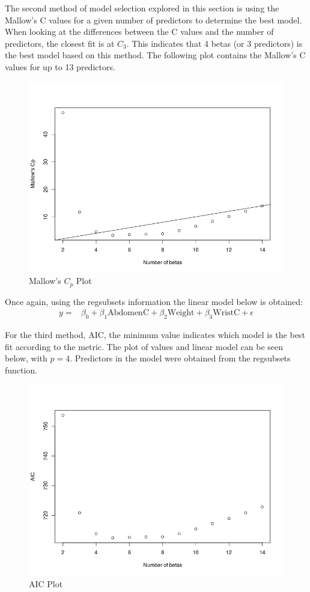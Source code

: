 \documentclass[a4paper, 11pt]{article}
\begin{document}
The second method of model selection explored in this section is using the Mallow's C values for a given number of predictors to determine the best model. When looking at the differences between the C values and the number of predictors, the closest fit is at $C_3$. This indicates that 4 betas (or 3 predictors) is the best model based on this method. The following plot contains the Mallow's C values for up to 13 predictors.

\begin{figure}[H]
	\centering
	\caption{Mallow's $C_p$ Plot}
	\centerline{\includegraphics[width=.8\textwidth]{mallows_c.png}}
\end{figure}

Once again, using the regsubsets information the linear model below is obtained:
\begin{align*}
	y = & \beta_0 + \beta_1\text{AbdomenC} + \beta_2\text{Weight} + \beta_3\text{WristC} + \epsilon
\end{align*}

For the third method, AIC, the minimum value indicates which model is the best fit according to the metric. The plot of values and linear model can be seen below, with $p=4$. Predictors in the model were obtained from the regsubsets function.
\begin{figure}[H]
	\centering
	\caption{AIC Plot}
	\centerline{\includegraphics[width=.8\textwidth]{aic.png}}
\end{figure}
\end{document}
